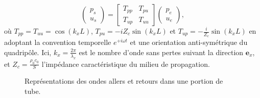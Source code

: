 
\begin{equation}
    \begin{pmatrix}
        p_s\\
        u_s
    \end{pmatrix}=\begin{bmatrix}
        T_{pp} & T_{pu} \\
        T_{up} & T_{uu}
    \end{bmatrix}\begin{pmatrix}
        p_e\\
        u_e
    \end{pmatrix},
    \label{eq:TMatrix_TppTuu}
\end{equation}
où $T_{pp}=T_{uu}=\cos(k_x L)$, $T_{pu}=-i Z_c \sin(k_x L)$ et $T_{up}=-\frac{i}{Z_c}\sin(k_x L)$ en adoptant la convention temporelle $e^{+i\omega t}$ et une orientation anti-symétrique du quadripôle. Ici, $k_x = \frac{2\pi}{\lambda_x}$ est le nombre d'onde sans pertes suivant la direction $\mathbf e_x$, et $Z_c = \frac{\rho_0 c_0}{S}$ l'impédance caractéristique du milieu de propagation. 

\begin{figure}[!ht]
    \centering
    
    \caption{Représentations des ondes allers et retours dans une portion de tube.}%
    \label{fig:WavesInDuctPiece}
\end{figure}



